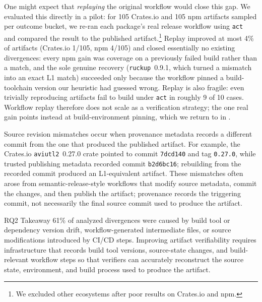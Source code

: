 One might expect that \emph{replaying} the original workflow would close this gap. We evaluated this directly in a pilot: for 105 Crates.io and 105 npm artifacts sampled per outcome bucket, we re-ran each package's real release workflow using \texttt{act}~\cite{nektos_act} and compared the result to the published artifact.\footnote{We excluded other ecosystems after poor results on Crates.io and npm.} Replay improved at most 4\% of artifacts (Crates.io 1/105, npm 4/105) and closed essentially no existing divergences: every npm gain was coverage on a previously failed build rather than a match, and the sole genuine recovery (\texttt{ruckup}~0.9.1, which turned a mismatch into an exact L1 match) succeeded only because the workflow pinned a build-toolchain version our heuristic had guessed wrong. Replay is also fragile: even trivially reproducing artifacts fail to build under \texttt{act} in roughly 9 of 10 cases. Workflow replay therefore does not scale as a verification strategy; the one real gain points instead at build-environment pinning, which we return to in .

Source revision mismatches occur when provenance metadata records a different commit from the one that produced the published artifact.  For example, the Crates.io \texttt{aviutl2}~0.27.0 crate pointed to commit \texttt{7dcd140} and tag \texttt{0.27.0}, while trusted publishing metadata recorded commit \texttt{b2d6bc16}; rebuilding from the recorded commit produced an L1-equivalent artifact. These mismatches often arose from semantic-release-style workflows that modify source metadata, commit the changes, and then publish the artifact; provenance records the triggering commit, not necessarily the final source commit used to produce the artifact.

\begin{rqanswer}{RQ2 Takeaway}
61\% of analyzed divergences were caused by build tool or dependency version drift, workflow-generated intermediate files, or source modifications introduced by CI/CD steps. Improving artifact verifiability requires infrastructure that records build tool versions, source-state changes, and build-relevant workflow steps so that verifiers can accurately reconstruct the source state, environment, and build process used to produce the artifact.
\end{rqanswer}


